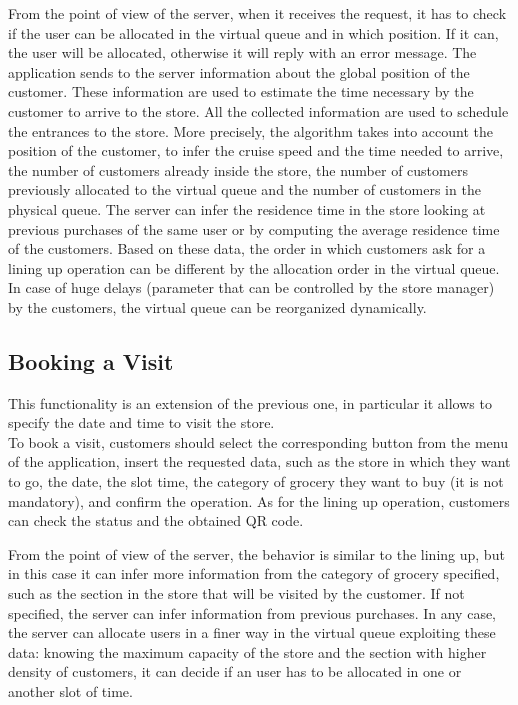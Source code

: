 From the point of view of the server, when it receives the request, it has to check if the user can be allocated in the virtual queue and in which position. If it can, the user will be allocated, otherwise it will reply with an error message.
The application sends to the server information about the global position of the customer. These information are used to estimate the time necessary by the customer to arrive to the store.
All the collected information are used to schedule the entrances to the store.
More precisely, the algorithm takes into account the position of the customer, to infer the cruise speed and the time needed to arrive, the number of customers already inside the store, the number of customers previously allocated to the virtual queue and the number of customers in the physical queue.
The server can infer the residence time in the store looking at previous purchases of the same user or by computing the average residence time of the customers.
Based on these data, the order in which customers ask for a lining up operation can be different by the allocation order in the virtual queue. In case of huge delays (parameter that can be controlled by the store manager) by the customers, the virtual queue can be reorganized dynamically.

\subsection{Booking a Visit}
This functionality is an extension of the previous one, in particular it allows to specify the date and time to visit the store.\\
To book a visit, customers should select the corresponding button from the menu of the application, insert the requested data, such as the store in which they want to go, the date, the slot time, the category of grocery they want to buy (it is not mandatory), and confirm the operation.
As for the lining up operation, customers can check the status and the obtained QR code.

From the point of view of the server, the behavior is similar to the lining up, but in this case it can infer more information from the category of grocery specified, such as the section in the store that will be visited by the customer. If not specified, the server can infer information from previous purchases.
In any case, the server can allocate users in a finer way in the virtual queue exploiting these data: knowing the maximum capacity of the store and the section with higher density of customers, it can decide if an user has to be allocated in one or another slot of time.

